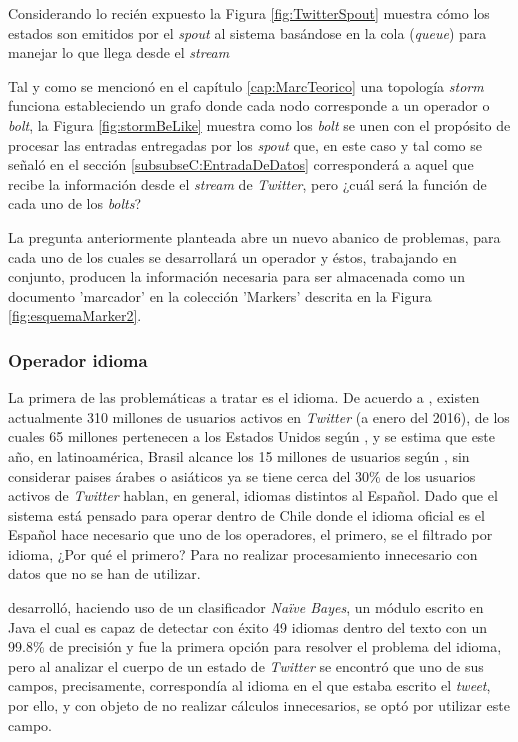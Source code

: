 Considerando lo recién expuesto la Figura \ref{fig:TwitterSpout} muestra cómo los estados son emitidos por el \textit{spout} al sistema basándose en la cola (\textit{queue}) para manejar lo que llega desde el \textit{stream}

Tal y como se mencionó en el capítulo \ref{cap:MarcTeorico} una topología \textit{storm} funciona estableciendo un grafo donde cada nodo corresponde a un operador o \textit{bolt}, la Figura \ref{fig:stormBeLike} muestra como los \textit{bolt} se unen con el propósito de procesar las entradas entregadas por los \textit{spout} que, en este caso y tal como se señaló en el sección \ref{subsubseC:EntradaDeDatos} corresponderá a aquel que recibe la información desde el \textit{stream} de \textit{Twitter}, pero ¿cuál será la función de cada uno de los \textit{bolts}?

La pregunta anteriormente planteada abre un nuevo abanico de problemas, para cada uno de los cuales se desarrollará un operador y éstos, trabajando en conjunto, producen la información necesaria para ser almacenada como un documento 'marcador' en la colección 'Markers' descrita en la Figura \ref{fig:esquemaMarker2}.

\subsubsection*{Operador idioma}
\label{subsubsec:1op}

La primera de las problemáticas a tratar es el idioma. De acuerdo a \cite{TwitterActiveUsers}, existen actualmente 310 millones de usuarios activos en \textit{Twitter} (a enero del 2016), de los cuales 65 millones pertenecen a los Estados Unidos según \cite{TwitterStats1}, y se estima que este año, en latinoamérica, Brasil alcance los 15 millones de usuarios según \cite{TwitterStats2}, sin considerar paises árabes o asiáticos ya se tiene cerca del 30\% de los usuarios activos de \textit{Twitter} hablan, en general, idiomas distintos al Español. Dado que el sistema está pensado para operar dentro de Chile donde el idioma oficial es el Español hace necesario que uno de los operadores, el primero, se el filtrado por idioma, ¿Por qué el primero? Para no realizar procesamiento innecesario con datos que no se han de utilizar.

\cite{languageDetector} desarrolló, haciendo uso de un clasificador \textit{Naïve Bayes}, un módulo escrito en Java el cual es capaz de detectar con éxito 49 idiomas dentro del texto con un 99.8\% de precisión y fue la primera opción para resolver el problema del idioma, pero al analizar el cuerpo de un estado de \textit{Twitter} se encontró que uno de sus campos, precisamente, correspondía al idioma en el que estaba escrito el \textit{tweet}, por ello, y con objeto de no realizar cálculos innecesarios, se optó por utilizar este campo.

